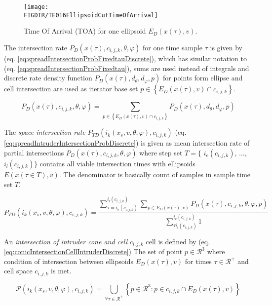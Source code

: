 \begin{figure}[H]
    \centering
    \texttt{[image: \\FIGDIR/TE016EllipsoidCutTimeOfArrival]} 
    \caption{Time Of Arrival (TOA) for one ellipsoid $E_D({x}(\tau),{v})$.}
    \label{fig:intruderTimeOfArrival}
\end{figure}

\noindent The intersection rate $P_D({x}(\tau),c_{i,j,k},\theta,\varphi)$ for one time sample $\tau$ is given by (eq. \ref{eq:spreadIntersectionProbFixedtauDiscrete}), which has similar notation to (eq. \ref{eq:spreadIntersectionProbFixedtau}), sums are used instead of integrals and discrete rate density function $P_D({x}(\tau),d_\theta,d_\varphi,{p})$ for points form ellipse and cell intersection are used as iterator base set ${p}\in\left\{E_D({x}(\tau),{v})\cap c_{i,j,k}\right\}$.

\begin{equation}\label{eq:spreadIntersectionProbFixedtauDiscrete}
    P_D({x}(\tau),c_{i,j,k},\theta,\varphi) =\sum_{{p}\in \left\{E_D({x}(\tau),{v})\cap c_{i,j,k}\right\}} P_D({x}(\tau),d_\theta,d_\varphi,{p})
\end{equation}

\noindent The \emph{space intersection rate} $P_{TD}(i_k({x}_s,{v},\theta,\varphi),c_{i,j,k})$ (eq. \ref{eq:spreadIntruderIntersectionProbDiscrete}) is given as mean intersection rate of partial intersections $P_D({x}(\tau),c_{i,j,k},\theta,\varphi)$ where step set $T=\{$ $i_e(c_{i,j,k})$, $\dots$, $i_l(c_{i,j,k})\}$ contains all viable intersection times with ellipsoids $E({x}(\tau\in T),{v})$. The denominator is basically count of samples in sample time set $T$. 

\begin{equation}\label{eq:spreadIntruderIntersectionProbDiscrete} 
    P_{TD}(i_k({x}_s,{v},\theta,\varphi),c_{i,j,k})=\frac{\sum_{\tau=i_e(c_{i,j,k})}^{i_l(c_{i,j,k})} \sum_{{p}\in E_D({x}(\tau),{v})}P_D({x}(\tau),c_{i,j,k},\theta,\varphi,{p})}{\sum_{\tau i_l(c_{i,j,k})}^{i_e(c_{i,j,k})} 1}
\end{equation}

\noindent An \emph{intersection of intruder cone and cell} $c_{i,j,k}$ cell is defined by (eq. \ref{eq:conicIntersectionCellIntruderDiscrete}) The  set of point ${p}\in\mathscr{R}^3$ where condition of intersection between ellipsoids $E_D({x}(\tau),{v})$ for times $\tau\in\mathscr{R}^+$ and cell space $c_{i,j,k}$ is met.

\begin{equation}\label{eq:conicIntersectionCellIntruderDiscrete}
    \mathscr{P}(i_k({x}_s,{v},\theta,\varphi),c_{i,j,k})= \bigcup_{\forall \tau\in\mathscr{R}^+} \left\{{p}\in\mathscr{R}^3:{p}\in c_{i,j,k}\cap E_D({x}(\tau),{v})\right\}
\end{equation}

